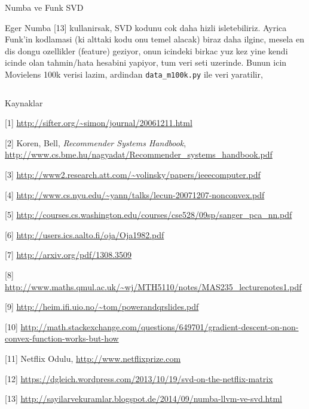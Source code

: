 \documentclass[12pt,fleqn]{article}\usepackage{../common}
\begin{document}
Numba ve Funk SVD

Eger Numba [13] kullanirsak, SVD kodunu cok daha hizli
isletebiliriz. Ayrica Funk'in kodlamasi (ki alttaki kodu onu temel alacak)
biraz daha ilginc, mesela en dis dongu ozellikler (feature) geziyor, onun
icindeki birkac yuz kez yine kendi icinde olan tahmin/hata hesabini
yapiyor, tum veri seti uzerinde. Bunun icin Movielens 100k verisi lazim,
ardindan \verb!data_m100k.py! ile veri yaratilir,

\inputminted[fontsize=\footnotesize]{python}{funk2.py}


Kaynaklar

[1] \url{http://sifter.org/~simon/journal/20061211.html}

[2] Koren, Bell, {\em Recommender Systems Handbook},
\url{http://www.cs.bme.hu/nagyadat/Recommender_systems_handbook.pdf}

[3] \url{http://www2.research.att.com/~volinsky/papers/ieeecomputer.pdf}

[4] \url{http://www.cs.nyu.edu/~yann/talks/lecun-20071207-nonconvex.pdf}

[5] \url{http://courses.cs.washington.edu/courses/cse528/09sp/sanger_pca_nn.pdf}

[6] \url{http://users.ics.aalto.fi/oja/Oja1982.pdf}

[7] \url{http://arxiv.org/pdf/1308.3509}

[8] \url{http://www.maths.qmul.ac.uk/~wj/MTH5110/notes/MAS235_lecturenotes1.pdf}

[9] \url{http://heim.ifi.uio.no/~tom/powerandqrslides.pdf}

[10] \url{http://math.stackexchange.com/questions/649701/gradient-descent-on-non-convex-function-works-but-how}

[11] Netflix Odulu, \url{http://www.netflixprize.com}

[12] \url{https://dgleich.wordpress.com/2013/10/19/svd-on-the-netflix-matrix}

[13] \url{http://sayilarvekuramlar.blogspot.de/2014/09/numba-llvm-ve-svd.html}
\end{document}
